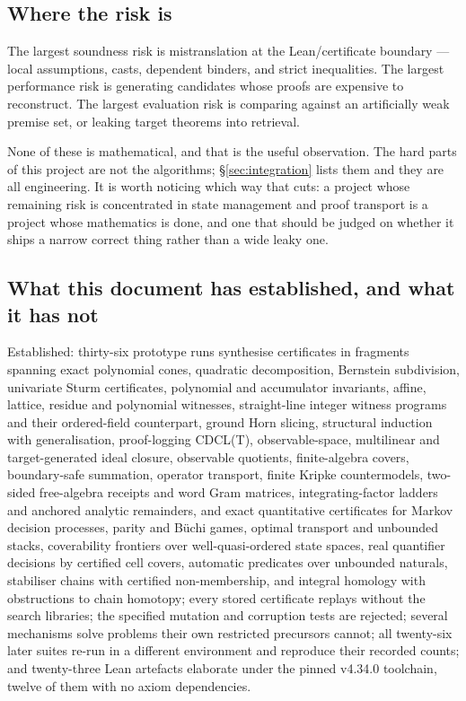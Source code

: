 \subsection{Where the risk is}

The largest soundness risk is mistranslation at the Lean/certificate boundary
--- local assumptions, casts, dependent binders, and strict inequalities. The
largest performance risk is generating candidates whose proofs are expensive to
reconstruct. The largest evaluation risk is comparing against an artificially
weak premise set, or leaking target theorems into retrieval.

None of these is mathematical, and that is the useful observation. The hard
parts of this project are not the algorithms; \S\ref{sec:integration} lists them
and they are all engineering. It is worth noticing which way that cuts: a
project whose remaining risk is concentrated in state management and proof
transport is a project whose mathematics is done, and one that should be judged
on whether it ships a narrow correct thing rather than a wide leaky one.

\subsection{What this document has established, and what it has not}

Established: thirty-six prototype runs synthesise certificates in fragments
spanning exact polynomial cones, quadratic decomposition, Bernstein subdivision,
univariate Sturm certificates, polynomial and accumulator invariants, affine,
lattice, residue and polynomial witnesses, straight-line integer witness
programs and their ordered-field counterpart, ground Horn slicing, structural
induction with generalisation, proof-logging CDCL(T), observable-space,
multilinear and target-generated ideal closure, observable quotients,
finite-algebra covers, boundary-safe summation, operator transport, finite
Kripke countermodels, two-sided free-algebra receipts and word Gram matrices,
integrating-factor ladders and anchored analytic remainders, and exact
quantitative certificates for Markov decision processes, parity and B\"uchi
games, optimal transport and unbounded stacks, coverability frontiers over
well-quasi-ordered state spaces, real quantifier decisions by certified cell
covers, automatic predicates over unbounded naturals, stabiliser chains with
certified non-membership, and integral homology with obstructions to chain
homotopy; every stored certificate replays without the search libraries; the
specified mutation and corruption tests are rejected; several mechanisms solve
problems their own restricted precursors cannot; all twenty-six later suites
re-run in a different environment and reproduce their recorded counts; and
twenty-three Lean artefacts elaborate under the pinned v4.34.0 toolchain,
twelve of them with no axiom dependencies.

